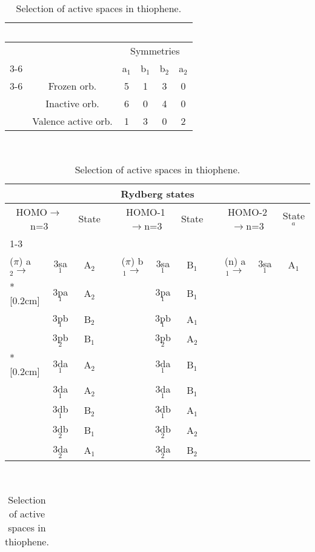 \begin{table}[p]
\caption{\label{tab:thio}Selection of active spaces in thiophene.}
\vspace{-0.4cm}
\begin{center}
\begin{tabular}{lccccc}
\multicolumn{6}{c}{\hspace*{14.5cm}~}\\
\hline
\hspace*{3cm}     &  & \multicolumn{4}{c}{Symmetries} \\ \cline{3-6} 
                  &  & a$_1$ & b$_1$ & b$_2$ & a$_2$ \\[0.05cm] \cline{3-6}
 & Frozen orb.        &  5 & 1 & 3 & 0 \\
 & Inactive orb.      &  6 & 0 & 4 & 0 \\
 & Valence active orb.&  1 & 3 & 0 & 2 \\[0.5cm]
\end{tabular}
\\
\begin{tabular}{lcccccccccc}
\\
\multicolumn{11}{c}{Rydberg states}\\
\hline
\multicolumn{2}{c}{HOMO$\to$n=3} & State & & \multicolumn{2}{c}{HOMO-1$\to$n=3} & State & & \multicolumn{2}{c}{HOMO-2$\to$n=3}& State$^a$\\\cline{1-3}\cline{5-7}\cline{9-11}
\\
($\pi$) a$_2\to$ & 3sa$_1$ & A$_2$ & & ($\pi$) b$_1\to$ & 3sa$_1$ & B$_1$ & & (n) a$_1\to$ & 3sa$_1$ & A$_1$ \\*[0.2cm]
		 & 3pa$_1$ & A$_2$ & &                  & 3pa$_1$ & B$_1$ \\
		 & 3pb$_1$ & B$_2$ & &                  & 3pb$_1$ & A$_1$ \\
		 & 3pb$_2$ & B$_1$ & &                  & 3pb$_2$ & A$_2$ \\*[0.2cm]
		 & 3da$_1$ & A$_2$ & &                  & 3da$_1$ & B$_1$ \\
		 & 3da$_1$ & A$_2$ & &                  & 3da$_1$ & B$_1$ \\
		 & 3db$_1$ & B$_2$ & &                  & 3db$_1$ & A$_1$ \\
		 & 3db$_2$ & B$_1$ & &                  & 3db$_2$ & A$_2$ \\
		 & 3da$_2$ & A$_1$ & &                  & 3da$_2$ & B$_2$ \\
\hline
\end{tabular}
\\
\begin{tabular}{ll}

\end{tabular}
\end{center}
\end{table}
